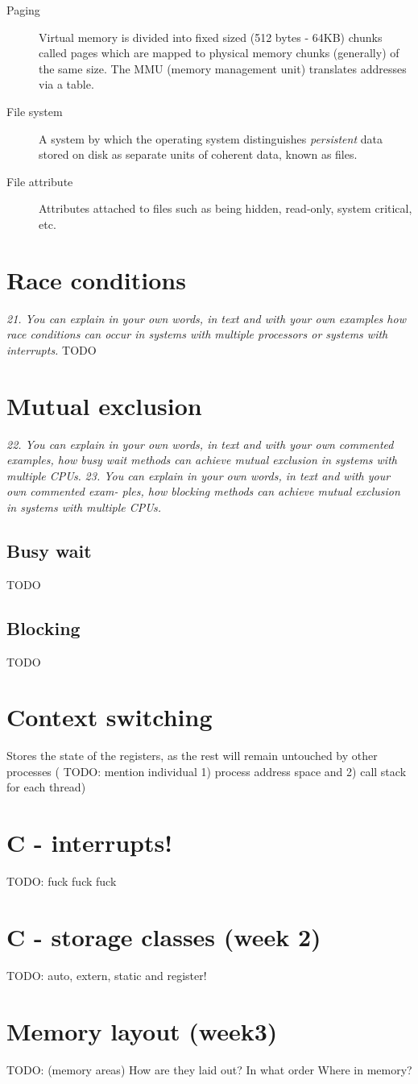 \documentclass{article}
\begin{document}
\begin{description}
\item[Paging]
  Virtual memory is divided into fixed sized (512 bytes - 64KB) chunks called pages which are mapped to physical memory chunks (generally) of the same size. The MMU (memory management unit) translates addresses via a table.

\item[File system]
  A system by which the operating system distinguishes \emph{persistent} data stored on disk as separate units of coherent data, known as files.

\item[File attribute]
  Attributes attached to files such as being hidden, read-only, system critical, etc.

\end{description}


\section{Race conditions}
\emph{21. You can explain in your own words, in text and with your own examples how race conditions can occur in systems with multiple processors or systems with interrupts.}
TODO


\section{Mutual exclusion}
\emph{22. You can explain in your own words, in text and with your own commented examples, how busy wait methods can achieve mutual exclusion in systems with multiple CPUs.}
\emph{23. You can explain in your own words, in text and with your own commented exam- ples, how blocking methods can achieve mutual exclusion in systems with multiple CPUs.}

\subsection{Busy wait}
TODO

\subsection{Blocking}
TODO


\section*{Context switching}
Stores the state of the registers, as the rest will remain untouched by other processes (
TODO: mention individual 1) process address space and 2) call stack for each thread)


\section*{C - interrupts!}
TODO: fuck fuck fuck


\section*{C - storage classes (week 2)}
TODO: auto, extern, static and register!


\section*{Memory layout (week3)}
TODO: (memory areas) How are they laid out? In what order Where in memory?
\end{document}
